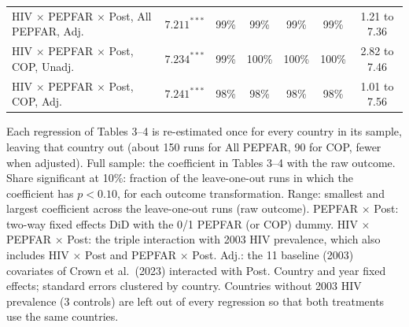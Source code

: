 \begin{table}[htbp]
{\begin{tabular}{lcccccc}
HIV $\times$ PEPFAR $\times$ Post, All PEPFAR, Adj. & $7.211^{***}$ & 99\% & 99\% & 99\% & 99\% & 1.21 to 7.36 \\
HIV $\times$ PEPFAR $\times$ Post, COP, Unadj. & $7.234^{***}$ & 99\% & 100\% & 100\% & 100\% & 2.82 to 7.46 \\
HIV $\times$ PEPFAR $\times$ Post, COP, Adj. & $7.241^{***}$ & 98\% & 98\% & 98\% & 98\% & 1.01 to 7.56 \\
\bottomrule
\end{tabular}}
\par\vspace{4pt}
\begin{minipage}{\textwidth}\footnotesize Each regression of Tables 3--4 is re-estimated once for every country in its sample, leaving that country out (about 150 runs for All PEPFAR, 90 for COP, fewer when adjusted). Full sample: the coefficient in Tables 3--4 with the raw outcome. Share significant at 10\%: fraction of the leave-one-out runs in which the coefficient has $p<0.10$, for each outcome transformation. Range: smallest and largest coefficient across the leave-one-out runs (raw outcome). PEPFAR $\times$ Post: two-way fixed effects DiD with the 0/1 PEPFAR (or COP) dummy. HIV $\times$ PEPFAR $\times$ Post: the triple interaction with 2003 HIV prevalence, which also includes HIV $\times$ Post and PEPFAR $\times$ Post. Adj.: the 11 baseline (2003) covariates of Crown et al.\ (2023) interacted with Post. Country and year fixed effects; standard errors clustered by country. Countries without 2003 HIV prevalence (3 controls) are left out of every regression so that both treatments use the same countries.\end{minipage}
\end{table}
